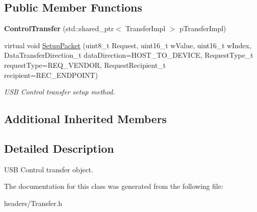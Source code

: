 \subsection*{Public Member Functions}
\begin{DoxyCompactItemize}
\item 
\hypertarget{class_lib_u_s_b_1_1_control_transfer_a8bfafa78c1d745221cf80da5333abd17}{{\bfseries Control\-Transfer} (std\-::shared\-\_\-ptr$<$ Transfer\-Impl $>$ p\-Transfer\-Impl)}\label{class_lib_u_s_b_1_1_control_transfer_a8bfafa78c1d745221cf80da5333abd17}

\item 
\hypertarget{class_lib_u_s_b_1_1_control_transfer_a83d9e5b876cb4654e37168b1bb93f3cd}{virtual void \hyperlink{class_lib_u_s_b_1_1_control_transfer_a83d9e5b876cb4654e37168b1bb93f3cd}{Setup\-Packet} (uint8\-\_\-t Request, uint16\-\_\-t w\-Value, uint16\-\_\-t w\-Index, Data\-Transfer\-Direction\-\_\-t data\-Direction=H\-O\-S\-T\-\_\-\-T\-O\-\_\-\-D\-E\-V\-I\-C\-E, Request\-Type\-\_\-t request\-Type=R\-E\-Q\-\_\-\-V\-E\-N\-D\-O\-R, Request\-Recipient\-\_\-t recipient=R\-E\-C\-\_\-\-E\-N\-D\-P\-O\-I\-N\-T)}\label{class_lib_u_s_b_1_1_control_transfer_a83d9e5b876cb4654e37168b1bb93f3cd}

\begin{DoxyCompactList}\small\item\em U\-S\-B Control transfer setup method. \end{DoxyCompactList}\end{DoxyCompactItemize}
\subsection*{Additional Inherited Members}


\subsection{Detailed Description}
U\-S\-B Control transfer object. 

The documentation for this class was generated from the following file\-:\begin{DoxyCompactItemize}
\item 
headers/Transfer.\-h\end{DoxyCompactItemize}
